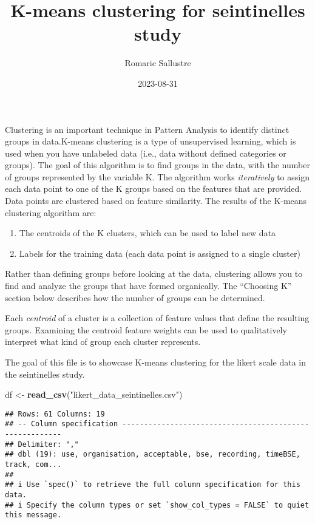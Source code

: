 \documentclass[
]{article}
\title{K-means clustering for seintinelles study}
\author{Romaric Sallustre}
\date{2023-08-31}
\newenvironment{Shaded}{\begin{snugshade}}{\end{snugshade}}
\newcommand{\FunctionTok}[1]{\textcolor[rgb]{0.13,0.29,0.53}{\textbf{#1}}}
\newcommand{\NormalTok}[1]{#1}
\newcommand{\OtherTok}[1]{\textcolor[rgb]{0.56,0.35,0.01}{#1}}
\newcommand{\StringTok}[1]{\textcolor[rgb]{0.31,0.60,0.02}{#1}}
\begin{document}
\maketitle

Clustering is an important technique in Pattern Analysis to identify
distinct groups in data.K-means clustering is a type of unsupervised
learning, which is used when you have unlabeled data (i.e., data without
defined categories or groups). The goal of this algorithm is to find
groups in the data, with the number of groups represented by the
variable K. The algorithm works \emph{iteratively} to assign each data
point to one of the K groups based on the features that are provided.
Data points are clustered based on feature similarity. The results of
the K-means clustering algorithm are:

\begin{enumerate}
\def\labelenumi{\arabic{enumi}.}
\item
  The centroids of the K clusters, which can be used to label new data
\item
  Labels for the training data (each data point is assigned to a single
  cluster)
\end{enumerate}

Rather than defining groups before looking at the data, clustering
allows you to find and analyze the groups that have formed organically.
The ``Choosing K'' section below describes how the number of groups can
be determined.

Each \emph{centroid} of a cluster is a collection of feature values that
define the resulting groups. Examining the centroid feature weights can
be used to qualitatively interpret what kind of group each cluster
represents.

The goal of this file is to showcase K-means clustering for the likert
scale data in the seintinelles study.

\begin{Shaded}
\begin{Highlighting}[]
\NormalTok{df }\OtherTok{\textless{}{-}} \FunctionTok{read\_csv}\NormalTok{(}\StringTok{"likert\_data\_seintinelles.csv"}\NormalTok{) }
\end{Highlighting}
\end{Shaded}

\begin{verbatim}
## Rows: 61 Columns: 19
## -- Column specification --------------------------------------------------------
## Delimiter: ","
## dbl (19): use, organisation, acceptable, bse, recording, timeBSE, track, com...
## 
## i Use `spec()` to retrieve the full column specification for this data.
## i Specify the column types or set `show_col_types = FALSE` to quiet this message.
\end{verbatim}
\end{document}
